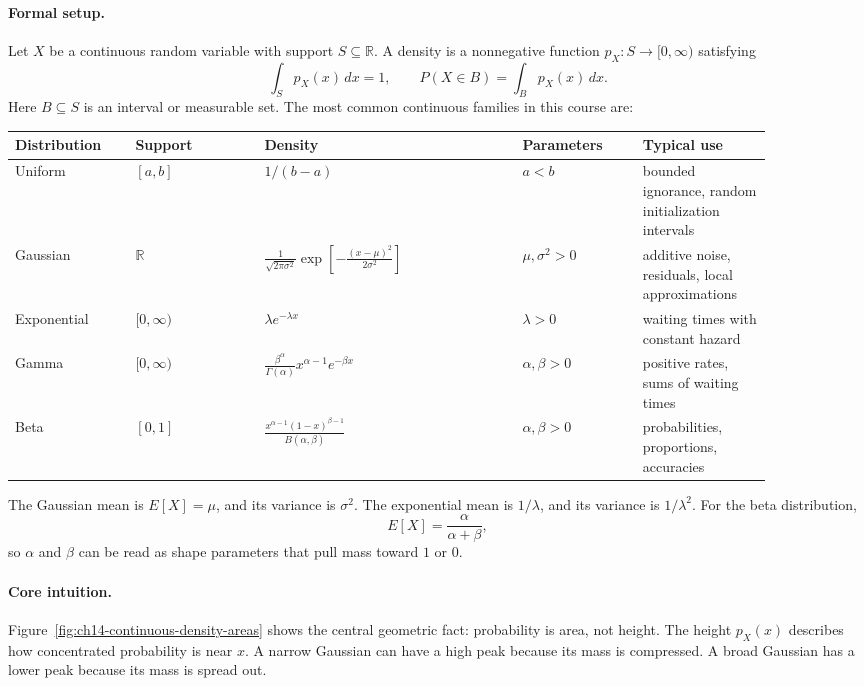 \paragraph{Formal setup.}
Let \(X\) be a continuous random variable with support \(S\subseteq\mathbb R\). A density is a nonnegative function \(p_X:S\to[0,\infty)\) satisfying
\[
\boxed{\int_S p_X(x)\,dx=1,\qquad P(X\in B)=\int_B p_X(x)\,dx.}
\]
Here \(B\subseteq S\) is an interval or measurable set. The most common continuous families in this course are:

\begin{center}
\small
\setlength{\tabcolsep}{2pt}
\renewcommand{\arraystretch}{1.22}
\begin{tabular}{p{0.14\linewidth}p{0.15\linewidth}p{0.30\linewidth}p{0.14\linewidth}p{0.15\linewidth}}
\toprule
Distribution & Support & Density & Parameters & Typical use \\
\midrule
Uniform & \([a,b]\) & \(1/(b-a)\) & \(a<b\) & bounded ignorance, random initialization intervals \\
Gaussian & \(\mathbb R\) & \(\frac{1}{\sqrt{2\pi\sigma^2}}\exp\!\left[-\frac{(x-\mu)^2}{2\sigma^2}\right]\) & \(\mu,\sigma^2>0\) & additive noise, residuals, local approximations \\
Exponential & \([0,\infty)\) & \(\lambda e^{-\lambda x}\) & \(\lambda>0\) & waiting times with constant hazard \\
Gamma & \([0,\infty)\) & \(\frac{\beta^\alpha}{\Gamma(\alpha)}x^{\alpha-1}e^{-\beta x}\) & \(\alpha,\beta>0\) & positive rates, sums of waiting times \\
Beta & \([0,1]\) & \(\frac{x^{\alpha-1}(1-x)^{\beta-1}}{B(\alpha,\beta)}\) & \(\alpha,\beta>0\) & probabilities, proportions, accuracies \\
\bottomrule
\end{tabular}
\end{center}

The Gaussian mean is \(E[X]=\mu\), and its variance is \(\sigma^2\). The exponential mean is \(1/\lambda\), and its variance is \(1/\lambda^2\). For the beta distribution,
\[
E[X]=\frac{\alpha}{\alpha+\beta},
\]
so \(\alpha\) and \(\beta\) can be read as shape parameters that pull mass toward \(1\) or \(0\).

\paragraph{Core intuition.}
Figure~\ref{fig:ch14-continuous-density-areas} shows the central geometric fact: probability is area, not height. The height \(p_X(x)\) describes how concentrated probability is near \(x\). A narrow Gaussian can have a high peak because its mass is compressed. A broad Gaussian has a lower peak because its mass is spread out.

